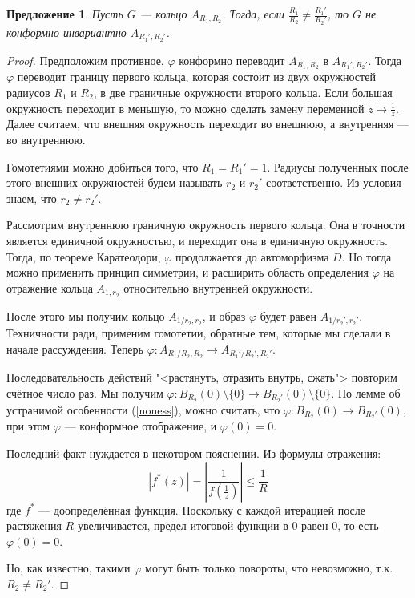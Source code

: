 \documentclass[12pt]{article}
\newcounter{cnt}
\theoremstyle{thmnote}
\newtheorem{proposition}[cnt]{Предложение}
\theoremstyle{remark}
\theoremstyle{defnote}
\begin{document}
\begin{proposition}
    Пусть $G$ --- кольцо $A_{R_1, R_2}$. Тогда, если $\frac{R_1}{R_2} \neq \frac{R_1'}{R_2'}$, то $G$ не конформно инвариантно $A_{R_1',R_2'}$.
\end{proposition}
\begin{proof}
    Предположим противное, $\varphi$ конформно переводит $A_{R_1, R_2}$ в $A_{R_1',R_2'}$. Тогда $\varphi$ переводит границу первого кольца, которая состоит из двух окружностей радиусов $R_1$ и $R_2$, в две граничные окружности второго кольца. Если большая окружность переходит в меньшую, то можно сделать замену переменной $z \mapsto \frac{1}{z}$. Далее считаем, что внешняя окружность переходит во внешнюю, а внутренняя --- во внутреннюю.

    Гомотетиями можно добиться того, что $R_1 = R_1' = 1$. Радиусы полученных после этого внешних окружностей будем называть $r_2$ и $r_2'$ соответственно. Из условия знаем, что $r_2 \neq r_2'$.

    Рассмотрим внутреннюю граничную окружность первого кольца. Она в точности является единичной окружностью, и переходит она в единичную окружность. Тогда, по теореме Каратеодори, $\varphi$ продолжается до автоморфизма $D$. Но тогда можно применить принцип симметрии, и расширить область определения $\varphi$ на отражение кольца $A_{1, r_2}$ относительно внутренней окружности.
    \begin{center}
    \begin{tikzpicture}
        
    \end{tikzpicture}
    \end{center}

    После этого мы получим кольцо $A_{1/r_2, r_2}$, и образ $\varphi$ будет равен $A_{1/r_2', r_2'}$. Техничности ради, применим гомотетии, обратные тем, которые мы сделали в начале рассуждения. Теперь $\varphi: A_{R_1/R_2, R_2} \to A_{R_1'/R_2', R_2'}$.

    Последовательность действий "<растянуть, отразить внутрь, сжать"> повторим счётное число раз. Мы получим $\varphi: B_{R_2}(0) \setminus \{0\} \to B_{R_2'}(0) \setminus \{0\}$. По лемме об устранимой особенности (\ref{noness}), можно считать, что $\varphi: B_{R_2}(0) \to B_{R_2'}(0)$, при этом $\varphi$ --- конформное отображение, и $\varphi(0) = 0$. 
    
    Последний факт нуждается в некотором пояснении. Из формулы отражения:
    \begin{equation*}
        |f^*(z)| = \left|\frac{1}{f(\frac{1}{z})}\right| \leq \frac{1}{R}
    \end{equation*}
    где $f^*$ --- доопределённая функция. Поскольку с каждой итерацией после растяжения $R$ увеличивается, предел итоговой функции в 0 равен 0, то есть $\varphi(0) = 0$.
    
    Но, как известно, такими $\varphi$ могут быть только повороты, что невозможно, т.к. $R_2 \neq R_2'$.
\end{proof}
\end{document}
